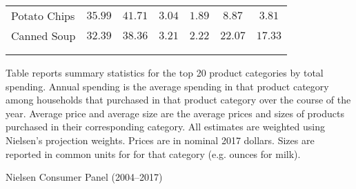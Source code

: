 \begin{table}[!htbp]
\begin{tabularx}{\linewidth}{lXccccc}
Potato Chips & $35.99$ & $41.71$ & $3.04$ & $1.89$ & $8.87$ & $3.81$ \\
Canned Soup & $32.39$ & $38.36$ & $3.21$ & $2.22$ & $22.07$ & $17.33$ \\
\\[-1.8ex]\hline
\hline \\[-1.8ex]
\end{tabularx}
\begin{tablenotes}
Table reports summary statistics for the top 20 product categories by total spending. Annual spending is the average spending in that product category among households that purchased in that product category over the course of the year. Average price and average size are the average prices and sizes of products purchased in their corresponding category. All estimates are weighted using Nielsen's projection weights. Prices are in nominal 2017 dollars. Sizes are reported in common units for for that category (e.g. ounces for milk).
\end{tablenotes}
\begin{tablenotes}[Source]
Nielsen Consumer Panel (2004--2017)
\end{tablenotes}
\end{table}

